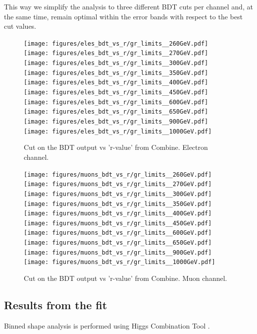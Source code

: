 This way we simplify the analysis to three different BDT cuts per channel and, at the same time, remain optimal within the error bands with respect  to the best cut values. 

\begin{figure}[!htb]%
\texttt{[image: figures/eles\_bdt\_vs\_r/gr\_limits\_\_260GeV.pdf]}
\texttt{[image: figures/eles\_bdt\_vs\_r/gr\_limits\_\_270GeV.pdf]}
\texttt{[image: figures/eles\_bdt\_vs\_r/gr\_limits\_\_300GeV.pdf]}
\texttt{[image: figures/eles\_bdt\_vs\_r/gr\_limits\_\_350GeV.pdf]}
\texttt{[image: figures/eles\_bdt\_vs\_r/gr\_limits\_\_400GeV.pdf]}
\texttt{[image: figures/eles\_bdt\_vs\_r/gr\_limits\_\_450GeV.pdf]}
\texttt{[image: figures/eles\_bdt\_vs\_r/gr\_limits\_\_600GeV.pdf]}
\texttt{[image: figures/eles\_bdt\_vs\_r/gr\_limits\_\_650GeV.pdf]}
\texttt{[image: figures/eles\_bdt\_vs\_r/gr\_limits\_\_900GeV.pdf]}
\hspace{1.9cm}
\texttt{[image: figures/eles\_bdt\_vs\_r/gr\_limits\_\_1000GeV.pdf]}
\caption{ Cut on the BDT output vs 'r-value' from Combine. Electron channel.}
\label{fig:ele_bdt_vs_r}                                                       
\end{figure}



\begin{figure}[!htb]%
\texttt{[image: figures/muons\_bdt\_vs\_r/gr\_limits\_\_260GeV.pdf]}
\texttt{[image: figures/muons\_bdt\_vs\_r/gr\_limits\_\_270GeV.pdf]}
\texttt{[image: figures/muons\_bdt\_vs\_r/gr\_limits\_\_300GeV.pdf]}
\texttt{[image: figures/muons\_bdt\_vs\_r/gr\_limits\_\_350GeV.pdf]}
\texttt{[image: figures/muons\_bdt\_vs\_r/gr\_limits\_\_400GeV.pdf]}
\texttt{[image: figures/muons\_bdt\_vs\_r/gr\_limits\_\_450GeV.pdf]}
\texttt{[image: figures/muons\_bdt\_vs\_r/gr\_limits\_\_600GeV.pdf]}
\texttt{[image: figures/muons\_bdt\_vs\_r/gr\_limits\_\_650GeV.pdf]}
\texttt{[image: figures/muons\_bdt\_vs\_r/gr\_limits\_\_900GeV.pdf]}
\hspace{1.9cm}
\texttt{[image: figures/muons\_bdt\_vs\_r/gr\_limits\_\_1000GeV.pdf]}
\caption{ Cut on the BDT output vs 'r-value' from Combine. Muon channel.}
\label{fig:muon_bdt_vs_r}           
\end{figure}

 
\subsection{Results from the fit}
Binned shape analysis is performed using Higgs Combination Tool  \cite{HiggsCombine}.  

